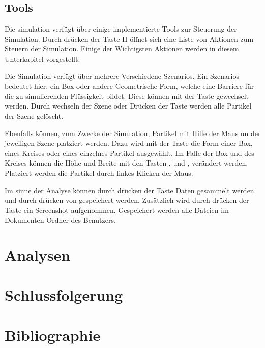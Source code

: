 \documentclass[a4paper, 12pt]{article}
\begin{document}
\subsection{Tools}
Die simulation verfügt über einige implementierte Tools zur Steuerung der Simulation. Durch drücken der Taste H öffnet sich eine Liste von Aktionen zum Steuern der Simulation. Einige der Wichtigsten Aktionen werden in diesem Unterkapitel vorgestellt. 

Die Simulation verfügt über mehrere Verschiedene \glqq Szenarios\grqq{}. Ein \glqq Szenarios\grqq{} bedeutet hier, ein Box oder andere Geometrische Form, welche eine Barriere für die zu simulierenden Flüssigkeit bildet. Diese können mit der Taste  gewechselt werden. Durch wechseln der Szene oder Drücken der Taste  werden alle Partikel der Szene gelöscht. 

Ebenfalls können, zum Zwecke der Simulation, Partikel mit Hilfe der Maus un der jeweiligen Szene platziert werden. Dazu wird mit der Taste  die Form einer Box, eines Kreises oder eines einzelnes Partikel
ausgewählt. Im Falle der Box und des Kreises können die Höhe und Breite mit den Tasten ,  und ,  verändert werden. Platziert werden die Partikel durch linkes Klicken der Maus.

Im sinne der Analyse können durch drücken der Taste  Daten gesammelt werden und durch drücken von  gespeichert werden. Zusätzlich wird durch drücken der Taste  ein Screenshot aufgenommen. Gespeichert werden alle Dateien im Dokumenten Ordner des Benutzers.

\section{Analysen} \label{section_6}

\section{Schlussfolgerung}

\section{Bibliographie}
\end{document}
